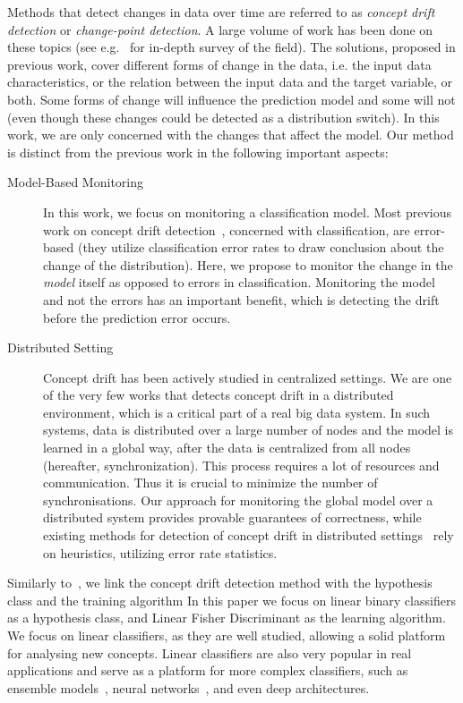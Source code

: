 \documentclass{sig-alternate-05-2015}
\begin{document}
Methods that detect changes in data over time are referred to as {\em concept drift detection} or {\em change-point detection}. 
A large volume of work has been done on these topics 
(see e.g.~\cite{basseville1993detection,brodsky2013nonparametric,ChenGupta2000,Tsymbal,Gama2014} 
for in-depth survey of the field).
The solutions, proposed in previous work, cover different forms of change in the data, i.e. 
the input data characteristics, or the relation between the input data and the target variable, or both. 
Some forms of change will influence the prediction model and some will not  
(even though these changes could be detected as a distribution switch). 
In this work, we are only concerned with the changes that affect the model.
Our method is distinct from the previous work in the following important aspects:
\begin{description}
\item[Model-Based Monitoring] In this work, we focus on monitoring a classification model. 
Most previous work on concept drift detection~\cite{baena2006early,gama2004learning,Nishida2007}, 
concerned with classification, are error-based  (they utilize classification error rates to 
draw conclusion about the change of the distribution). 
Here, we propose to monitor the change in the {\em model} itself as opposed to errors in classification.  
Monitoring the model and not the errors has an important benefit, which is detecting the 
drift before  the prediction error occurs.

\item[Distributed Setting]
    Concept drift has been actively studied in centralized settings. 
    We are one of the very few works \cite{AngGZPH13} that detects concept drift in a distributed 
    environment, which is a critical part of a real big data system.
    In such systems, data is distributed over a large number of nodes and the model is learned 
    in a global way, after the data is centralized from all nodes (hereafter, synchronization). 
    This process requires a lot of resources and communication. 
    Thus it is crucial to minimize the number of synchronisations. 
    Our approach for monitoring the global model over a distributed system  
    provides provable guarantees of correctness, while existing methods for detection of concept 
    drift in distributed settings~\cite{AngGZPH13} rely on heuristics, utilizing error rate statistics.
\end{description}


Similarly to~\cite{icml2014c2_harel14}, we link the concept drift detection method with the 
hypothesis class and the training algorithm  
In this paper we focus on linear binary classifiers as a hypothesis class, and
Linear Fisher Discriminant \cite{fisher1936use} as the learning algorithm. We focus on linear classifiers, as they are well studied, allowing a solid platform for analysing new concepts. Linear classifiers are also very popular in real applications and serve as a platform for more complex classifiers, such as ensemble models~\cite{Deva, eSVM},
neural networks~\cite{osadchy2015k}, and even deep architectures\cite{ROSS}.
\end{document}
